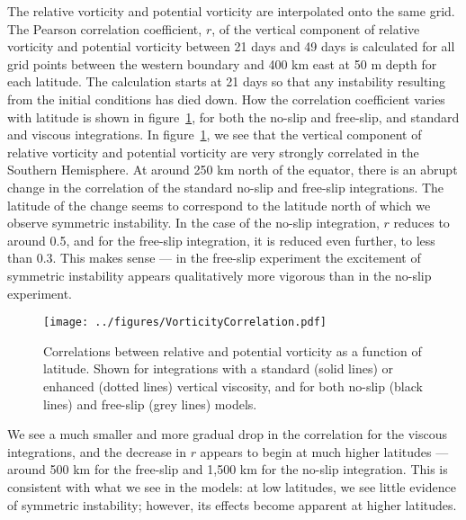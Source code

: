 The relative vorticity and potential vorticity are interpolated onto the same grid. The Pearson correlation coefficient, $r$, of the vertical component of relative vorticity and potential vorticity between 21 days and 49 days is calculated for all grid points between the western boundary and 400 km east at 50 m depth for each latitude. The calculation starts at 21 days so that any instability resulting from the initial conditions has died down. How the correlation coefficient varies with latitude is shown in figure~\ref{fig:VorticityCorrelations}, for both the no-slip and free-slip, and standard and viscous integrations.
In figure~\ref{fig:VorticityCorrelations}, we see that the vertical component of relative vorticity and potential vorticity are very strongly correlated in the Southern Hemisphere. At around 250 km north of the equator, there is an abrupt change in the correlation of the standard no-slip and free-slip integrations. The latitude of the change seems to correspond to the latitude north of which we observe symmetric instability. In the case of the no-slip integration, $r$ reduces to around 0.5, and for the free-slip integration, it is reduced even further, to less than 0.3. This makes sense --- in the free-slip experiment the excitement of symmetric instability appears qualitatively more vigorous than in the no-slip experiment.

\begin{figure}[t]
    \centering
    \texttt{[image: ../figures/VorticityCorrelation.pdf]}
    \caption{Correlations between relative and potential vorticity as a function of latitude. Shown for integrations with a standard (solid lines) or enhanced (dotted lines) vertical viscosity, and for both no-slip (black lines) and free-slip (grey lines) models.}
    \label{fig:VorticityCorrelations}
\end{figure}

We see a much smaller and more gradual drop in the correlation for the viscous integrations, and the decrease in $r$ appears to begin at much higher latitudes --- around 500 km for the free-slip and 1,500 km for the no-slip integration. This is consistent with what we see in the models: at low latitudes, we see little evidence of symmetric instability; however, its effects become apparent at higher latitudes.

